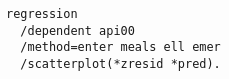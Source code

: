 \begin{verbatim}
regression
  /dependent api00
  /method=enter meals ell emer
  /scatterplot(*zresid *pred).
\end{verbatim}


